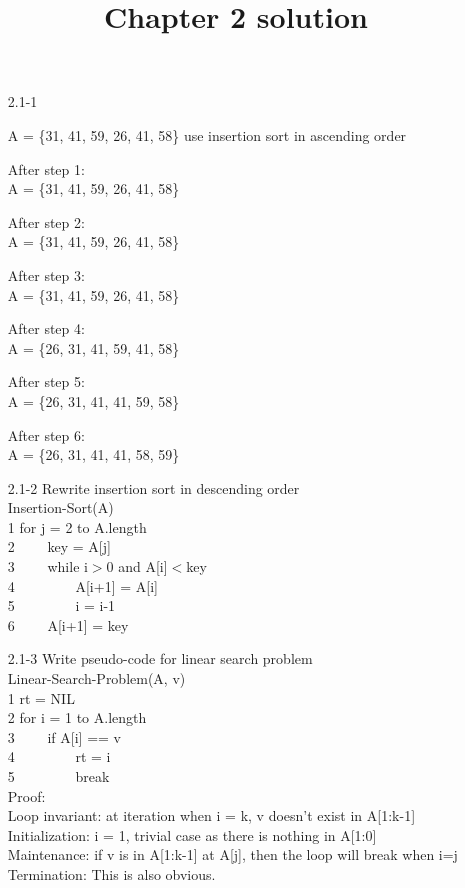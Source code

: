 \documentclass[]{article}
\title{}
\author{}
\begin{document}
\title{Chapter 2 solution}
\maketitle

\begin{enumerate}
\item[2.1-1]

A = \{31, 41, 59, 26, 41, 58\} use insertion sort in ascending order

\noindent
After step 1:\\
	A = \{31, 41, 59, 26, 41, 58\}
	
After step 2:\\
	A = \{31, 41, 59, 26, 41, 58\}
	
After step 3:\\
	A = \{31, 41, 59, 26, 41, 58\}
	
After step 4:\\
	A = \{26, 31, 41, 59, 41, 58\}
	
After step 5:\\
	A = \{26, 31, 41, 41, 59, 58\}
	
After step 6:\\
	A = \{26, 31, 41, 41, 58, 59\}

\item[2.1-2] Rewrite insertion sort in descending order\\
Insertion-Sort(A)\\
1 for	j = 2 to A.length\\
2 \ \ \ \ key = A[j]\\
3 \ \ \ \ while i$>$0 and A[i]$<$key\\
4 \ \ \ \ \ \ \ \ A[i+1] = A[i]\\
5 \ \ \ \ \ \ \ \ i = i-1\\
6 \ \ \ \ A[i+1] = key\\

\item[2.1-3] Write pseudo-code for linear search problem\\
Linear-Search-Problem(A, v)\\
1 rt = NIL\\
2 for i = 1 to A.length\\
3 \ \ \ \ if A[i] == v\\
4 \ \ \ \ \ \ \ \ rt = i\\
5 \ \ \ \ \ \ \ \ break\\

\noindent
Proof:\\
Loop invariant: at iteration when i = k, v doesn't exist in A[1:k-1]\\
Initialization: i = 1, trivial case as there is nothing in A[1:0]\\
Maintenance: if v is in A[1:k-1] at A[j], then the loop will break when i=j\\
Termination: This is also obvious.


\end{enumerate}
\end{document}
